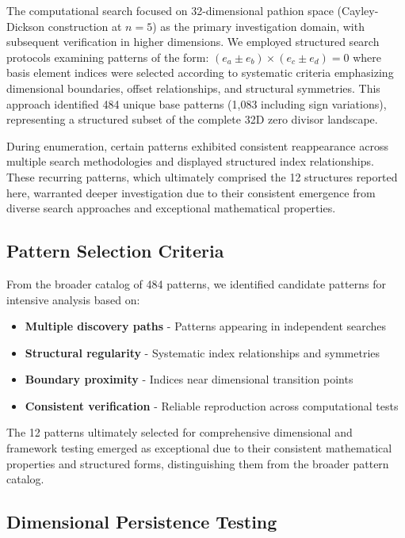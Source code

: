 \documentclass[11pt]{article}
\begin{document}
The computational search focused on 32-dimensional pathion space (Cayley-Dickson construction at $n=5$) as the primary investigation domain, with subsequent verification in higher dimensions. We employed structured search protocols examining patterns of the form: $(e_a \pm e_b) \times (e_c \pm e_d) = 0$ where basis element indices were selected according to systematic criteria emphasizing dimensional boundaries, offset relationships, and structural symmetries. This approach identified 484 unique base patterns (1,083 including sign variations), representing a structured subset of the complete 32D zero divisor landscape.

During enumeration, certain patterns exhibited consistent reappearance across multiple search methodologies and displayed structured index relationships. These recurring patterns, which ultimately comprised the 12 structures reported here, warranted deeper investigation due to their consistent emergence from diverse search approaches and exceptional mathematical properties.

\subsection{Pattern Selection Criteria}

From the broader catalog of 484 patterns, we identified candidate patterns for intensive analysis based on:

\begin{itemize}
\item \textbf{Multiple discovery paths} - Patterns appearing in independent searches
\item \textbf{Structural regularity} - Systematic index relationships and symmetries
\item \textbf{Boundary proximity} - Indices near dimensional transition points
\item \textbf{Consistent verification} - Reliable reproduction across computational tests
\end{itemize}

The 12 patterns ultimately selected for comprehensive dimensional and framework testing emerged as exceptional due to their consistent mathematical properties and structured forms, distinguishing them from the broader pattern catalog.

\subsection{Dimensional Persistence Testing}
\end{document}
